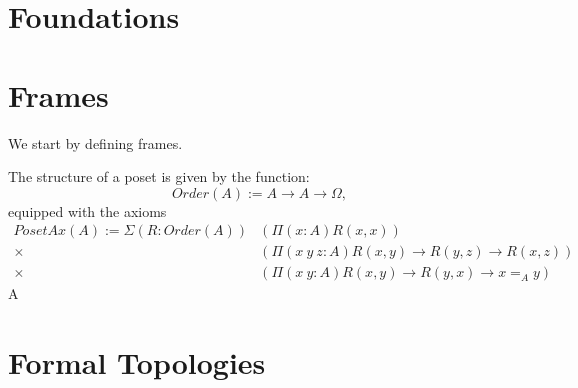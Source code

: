 \chapter{Foundations}

\chapter{Frames}

We start by defining frames.


\begin{defn}[Poset]
  The structure of a poset is given by the function:
  \begin{equation*}
    Order(A) := A \rightarrow A \rightarrow \Omega,
  \end{equation*}
  equipped with the axioms
  \begin{align*}
    PosetAx(A) := \Sigma \left(R : Order(A)\right)
                  &(\Pi(x : A) R(x, x))\\
                \times &(\Pi(x~y~z : A) R(x, y) \rightarrow R(y, z) \rightarrow R(x, z))\\
                \times &(\Pi(x~y : A) R(x, y) \rightarrow R(y, x) \rightarrow x =_A y)
  \end{align*}
  A
\end{defn}

\begin{defn}[Frame]
\end{defn}

\chapter{Formal Topologies}

\makebackmatter{}


